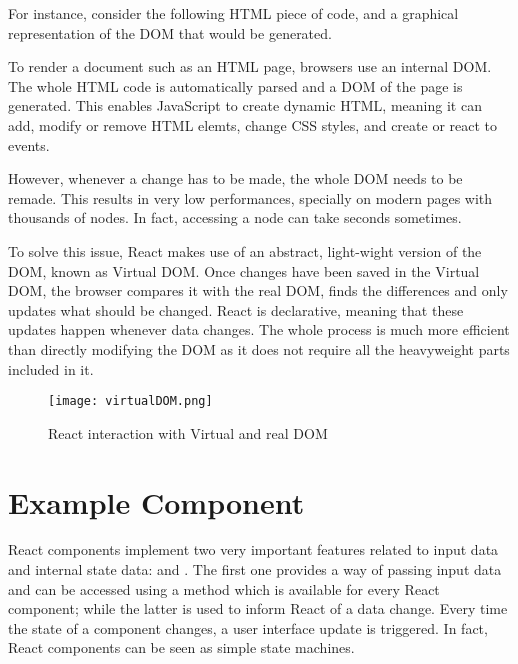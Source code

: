 For instance, consider the following HTML piece of code, and a graphical representation of the DOM that would be generated.




To render a document such as an HTML page, browsers use an internal DOM. The whole HTML code is automatically parsed and a DOM of the page is generated. This enables JavaScript to create dynamic HTML, meaning it can add, modify or remove HTML elemts, change CSS styles, and create or react to events.

However, whenever a change has to be made, the whole DOM needs to be remade. This results in very low performances, specially on modern pages with thousands of nodes. In fact, accessing a node can take seconds sometimes.

To solve this issue, React makes use of an abstract, light-wight version of the DOM, known as Virtual DOM. Once changes have been saved in the Virtual DOM, the browser compares it with the real DOM, finds the differences and only updates what should be changed. React is declarative, meaning that these updates happen whenever data changes. The whole process is much more efficient than directly modifying the DOM as it does not require all the heavyweight parts included in it.

\begin{figure}[H]
	\centering
	\texttt{[image: virtualDOM.png]}
	\caption{React interaction with Virtual and real DOM}
\end{figure}

\section{Example Component}

React components implement two very important features related to input data and internal state data:  and . The first one provides a way of passing input data and can be accessed using a  method which is available for every React component; while the latter is used to inform React of a data change. Every time the state of a component changes, a user interface update is triggered. In fact, React components can be seen as simple state machines.

